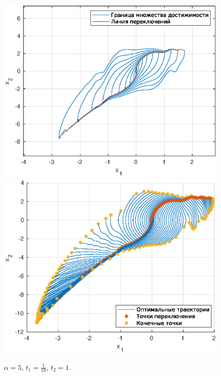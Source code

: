 \begin{figure}[h]
        \centering
        \includegraphics[width=0.49\linewidth]{examples/ev-start0-1end1alpha5.eps}
        \includegraphics[width=0.49\linewidth]{examples/1.eps}
        \caption{$\alpha = 5$, $t_1 = \frac{1}{10}$, $t_2 = 1$.}
\end{figure}